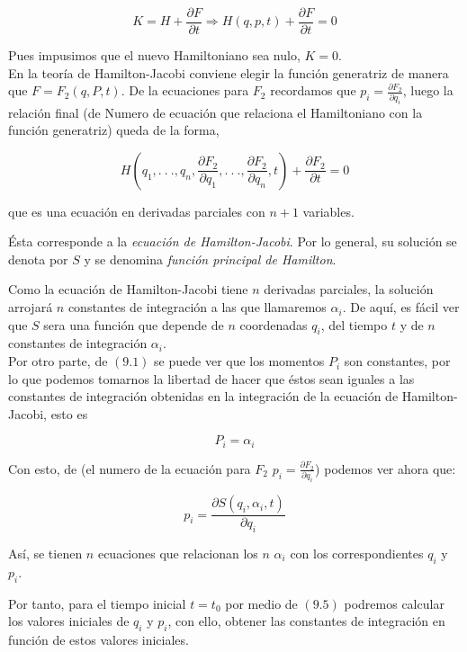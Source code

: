 \documentclass[12pt]{report}
\begin{document}
\begin{equation}
K=H+\frac{\partial F}{\partial t}\Rightarrow H(q,p,t)+\frac{\partial F}{\partial t}=0
\end{equation}

Pues impusimos que el nuevo Hamiltoniano sea nulo, $K=0$. \\

En la teoría de Hamilton-Jacobi conviene elegir la función generatriz de manera que $F=F_2(q,P,t)$. De la ecuaciones para $F_2$ recordamos que $p_i=\frac{\partial F_2}{\partial q_i}$, luego la relación final (de Numero de ecuación que relaciona el Hamiltoniano con la función generatriz) queda de la forma,

\begin{equation}
 H\left(q_1,.\ .\ .,q_n,\frac{\partial F_2}{\partial q_1},.\ .\ .,\frac{\partial F_2}{\partial q_n},t\right)+\frac{\partial F_2}{\partial t}=0
\end{equation}

que es una ecuación en derivadas parciales con $n+1$ variables.\par
Ésta corresponde a la \textit{ecuación de Hamilton-Jacobi}. Por lo general, su solución se denota por $S$ y se denomina \textit{función principal de Hamilton}.\par


Como la ecuación de Hamilton-Jacobi tiene $n$ derivadas parciales, la solución arrojará $n$ constantes de integración a las que llamaremos $\alpha_i$. De aquí, es fácil ver que $S$ sera una función que depende de $n$ coordenadas $q_i$, del tiempo $t$ y de $n$ constantes de integración $\alpha_i$. \\
Por otro parte, de $(9.1)$ se puede ver que los momentos $P_i$ son constantes, por lo que podemos tomarnos la libertad de hacer que éstos sean iguales a las constantes de integración obtenidas en la integración de la ecuación de Hamilton-Jacobi, esto es

\begin{equation}
 P_i=\alpha_i
\end{equation}

Con esto, de (el numero de la ecuación para $F_2$ $p_i=\displaystyle\frac{\partial F_2}{\partial q_i}$) podemos ver ahora que:

\begin{equation}
 p_i=\frac{\partial S(q_i,\alpha_i,t)}{\partial q_i}
\end{equation}

Así, se tienen $n$ ecuaciones que relacionan los $n$ $\alpha_i$ con los correspondientes $q_i$ y $p_i$.\par
Por tanto, para el tiempo inicial $t=t_0$ por medio de $(9.5)$ podremos calcular los valores iniciales de $q_i$ y $p_i$, con ello, obtener las constantes de integración en función de estos valores iniciales.\\
\end{document}
